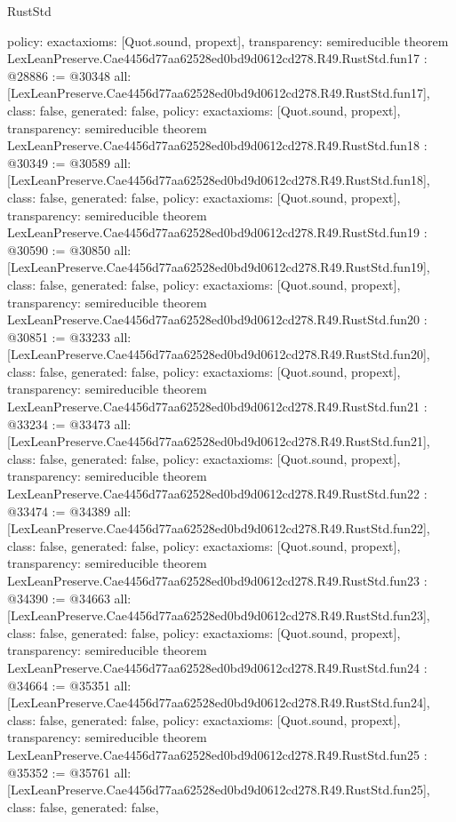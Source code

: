 \begin{lexlean}{RustStd}
\begin{coremodule}
{  policy: exact{axioms: [Quot.sound, propext]},
  transparency: semireducible
}
theorem LexLeanPreserve.Cae4456d77aa62528ed0bd9d0612cd278.R49.RustStd.fun17 : @28886 := @30348 {
  all: [LexLeanPreserve.Cae4456d77aa62528ed0bd9d0612cd278.R49.RustStd.fun17],
  class: false,
  generated: false,
  policy: exact{axioms: [Quot.sound, propext]},
  transparency: semireducible
}
theorem LexLeanPreserve.Cae4456d77aa62528ed0bd9d0612cd278.R49.RustStd.fun18 : @30349 := @30589 {
  all: [LexLeanPreserve.Cae4456d77aa62528ed0bd9d0612cd278.R49.RustStd.fun18],
  class: false,
  generated: false,
  policy: exact{axioms: [Quot.sound, propext]},
  transparency: semireducible
}
theorem LexLeanPreserve.Cae4456d77aa62528ed0bd9d0612cd278.R49.RustStd.fun19 : @30590 := @30850 {
  all: [LexLeanPreserve.Cae4456d77aa62528ed0bd9d0612cd278.R49.RustStd.fun19],
  class: false,
  generated: false,
  policy: exact{axioms: [Quot.sound, propext]},
  transparency: semireducible
}
theorem LexLeanPreserve.Cae4456d77aa62528ed0bd9d0612cd278.R49.RustStd.fun20 : @30851 := @33233 {
  all: [LexLeanPreserve.Cae4456d77aa62528ed0bd9d0612cd278.R49.RustStd.fun20],
  class: false,
  generated: false,
  policy: exact{axioms: [Quot.sound, propext]},
  transparency: semireducible
}
theorem LexLeanPreserve.Cae4456d77aa62528ed0bd9d0612cd278.R49.RustStd.fun21 : @33234 := @33473 {
  all: [LexLeanPreserve.Cae4456d77aa62528ed0bd9d0612cd278.R49.RustStd.fun21],
  class: false,
  generated: false,
  policy: exact{axioms: [Quot.sound, propext]},
  transparency: semireducible
}
theorem LexLeanPreserve.Cae4456d77aa62528ed0bd9d0612cd278.R49.RustStd.fun22 : @33474 := @34389 {
  all: [LexLeanPreserve.Cae4456d77aa62528ed0bd9d0612cd278.R49.RustStd.fun22],
  class: false,
  generated: false,
  policy: exact{axioms: [Quot.sound, propext]},
  transparency: semireducible
}
theorem LexLeanPreserve.Cae4456d77aa62528ed0bd9d0612cd278.R49.RustStd.fun23 : @34390 := @34663 {
  all: [LexLeanPreserve.Cae4456d77aa62528ed0bd9d0612cd278.R49.RustStd.fun23],
  class: false,
  generated: false,
  policy: exact{axioms: [Quot.sound, propext]},
  transparency: semireducible
}
theorem LexLeanPreserve.Cae4456d77aa62528ed0bd9d0612cd278.R49.RustStd.fun24 : @34664 := @35351 {
  all: [LexLeanPreserve.Cae4456d77aa62528ed0bd9d0612cd278.R49.RustStd.fun24],
  class: false,
  generated: false,
  policy: exact{axioms: [Quot.sound, propext]},
  transparency: semireducible
}
theorem LexLeanPreserve.Cae4456d77aa62528ed0bd9d0612cd278.R49.RustStd.fun25 : @35352 := @35761 {
  all: [LexLeanPreserve.Cae4456d77aa62528ed0bd9d0612cd278.R49.RustStd.fun25],
  class: false,
  generated: false,
}
\end{coremodule}
\end{lexlean}
